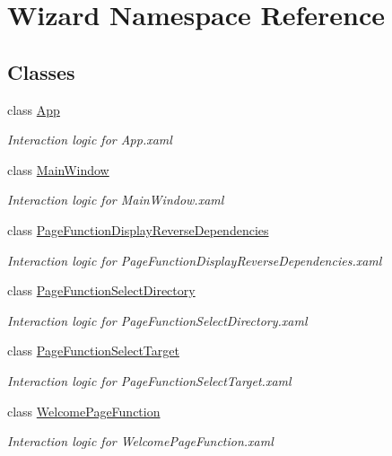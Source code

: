 \hypertarget{namespace_wizard}{}\section{Wizard Namespace Reference}
\label{namespace_wizard}
\subsection*{Classes}
\begin{DoxyCompactItemize}
\item 
class \mbox{\hyperlink{class_wizard_1_1_app}{App}}
\begin{DoxyCompactList}\small\item\em Interaction logic for App.\+xaml \end{DoxyCompactList}\item 
class \mbox{\hyperlink{class_wizard_1_1_main_window}{Main\+Window}}
\begin{DoxyCompactList}\small\item\em Interaction logic for Main\+Window.\+xaml \end{DoxyCompactList}\item 
class \mbox{\hyperlink{class_wizard_1_1_page_function_display_reverse_dependencies}{Page\+Function\+Display\+Reverse\+Dependencies}}
\begin{DoxyCompactList}\small\item\em Interaction logic for Page\+Function\+Display\+Reverse\+Dependencies.\+xaml \end{DoxyCompactList}\item 
class \mbox{\hyperlink{class_wizard_1_1_page_function_select_directory}{Page\+Function\+Select\+Directory}}
\begin{DoxyCompactList}\small\item\em Interaction logic for Page\+Function\+Select\+Directory.\+xaml \end{DoxyCompactList}\item 
class \mbox{\hyperlink{class_wizard_1_1_page_function_select_target}{Page\+Function\+Select\+Target}}
\begin{DoxyCompactList}\small\item\em Interaction logic for Page\+Function\+Select\+Target.\+xaml \end{DoxyCompactList}\item 
class \mbox{\hyperlink{class_wizard_1_1_welcome_page_function}{Welcome\+Page\+Function}}
\begin{DoxyCompactList}\small\item\em Interaction logic for Welcome\+Page\+Function.\+xaml \end{DoxyCompactList}\item 

\end{DoxyCompactItemize}
